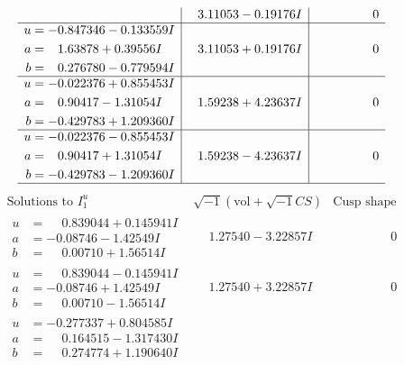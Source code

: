 \documentclass[1p]{elsarticle_modified}
\theoremstyle{definition}
\newcommand{\I}{\sqrt{-1}}
\begin{document}
$$\begin{array}{c|c|c}
 & \phantom{-}3.11053 - 0.19176 I & \phantom{-0.000000 } 0 \\ \hline\begin{aligned}
u &= -0.847346 - 0.133559 I \\
a &= \phantom{-}1.63878 + 0.39556 I \\
b &= \phantom{-}0.276780 - 0.779594 I\end{aligned}
 & \phantom{-}3.11053 + 0.19176 I & \phantom{-0.000000 } 0 \\ \hline\begin{aligned}
u &= -0.022376 + 0.855453 I \\
a &= \phantom{-}0.90417 - 1.31054 I \\
b &= -0.429783 + 1.209360 I\end{aligned}
 & \phantom{-}1.59238 + 4.23637 I & \phantom{-0.000000 } 0 \\ \hline\begin{aligned}
u &= -0.022376 - 0.855453 I \\
a &= \phantom{-}0.90417 + 1.31054 I \\
b &= -0.429783 - 1.209360 I\end{aligned}
 & \phantom{-}1.59238 - 4.23637 I & \phantom{-0.000000 } 0\\
 \hline 
 \end{array}$$\newpage$$\begin{array}{c|c|c}  
\text{Solutions to }I^u_{1}& \I (\text{vol} + \sqrt{-1}CS) & \text{Cusp shape}\\
 \hline 
\begin{aligned}
u &= \phantom{-}0.839044 + 0.145941 I \\
a &= -0.08746 - 1.42549 I \\
b &= \phantom{-}0.00710 + 1.56514 I\end{aligned}
 & \phantom{-}1.27540 - 3.22857 I & \phantom{-0.000000 } 0 \\ \hline\begin{aligned}
u &= \phantom{-}0.839044 - 0.145941 I \\
a &= -0.08746 + 1.42549 I \\
b &= \phantom{-}0.00710 - 1.56514 I\end{aligned}
 & \phantom{-}1.27540 + 3.22857 I & \phantom{-0.000000 } 0 \\ \hline\begin{aligned}
u &= -0.277337 + 0.804585 I \\
a &= \phantom{-}0.164515 - 1.317430 I \\
b &= \phantom{-}0.274774 + 1.190640 I\end{aligned}

\end{array}$$
\end{document}
